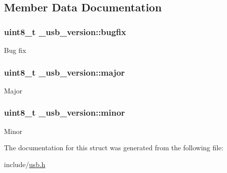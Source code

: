 \subsection{Member Data Documentation}
\hypertarget{struct__usb__version_a914f67fe68860253e895ff4817d4a528}{
\subsubsection[{bugfix}]{\setlength{\rightskip}{0pt plus 5cm}uint8\-\_\-t \-\_\-usb\-\_\-version\-::bugfix}}\label{struct__usb__version_a914f67fe68860253e895ff4817d4a528}
Bug fix \hypertarget{struct__usb__version_ace9e449a494b60ecaa0cb11cc86b2ce5}{
\subsubsection[{major}]{\setlength{\rightskip}{0pt plus 5cm}uint8\-\_\-t \-\_\-usb\-\_\-version\-::major}}\label{struct__usb__version_ace9e449a494b60ecaa0cb11cc86b2ce5}
Major \hypertarget{struct__usb__version_a296b41d0a6b23df94b88fba69c6caadf}{
\subsubsection[{minor}]{\setlength{\rightskip}{0pt plus 5cm}uint8\-\_\-t \-\_\-usb\-\_\-version\-::minor}}\label{struct__usb__version_a296b41d0a6b23df94b88fba69c6caadf}
Minor 

The documentation for this struct was generated from the following file\-:\begin{DoxyCompactItemize}
\item 
include/\hyperlink{usb_8h}{usb.\-h}\end{DoxyCompactItemize}
